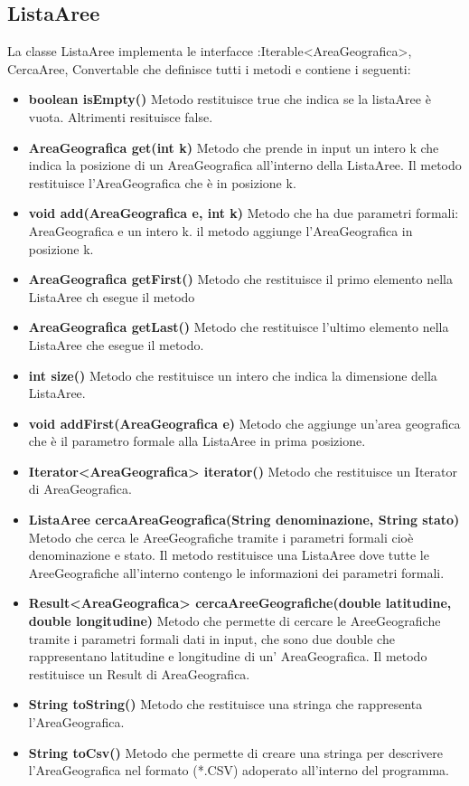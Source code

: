 \documentclass[a4paper, 12pt]{report}
\begin{document}
			\subsection{ListaAree}
			La classe ListaAree implementa le interfacce :Iterable<AreaGeografica>, CercaAree, Convertable che definisce tutti i metodi e contiene i seguenti:
			\begin{itemize}
			\item \textbf{boolean isEmpty()}
			Metodo restituisce true che indica se la listaAree è vuota. Altrimenti resituisce false.
			\item \textbf{AreaGeografica get(int k)}
			Metodo che prende in input un intero k che indica la posizione di un AreaGeografica all'interno della ListaAree. Il metodo restituisce l'AreaGeografica che è in posizione k.
			\item \textbf{void add(AreaGeografica e, int k)}
			Metodo che ha due parametri formali: AreaGeografica e un intero k.
			il metodo aggiunge l'AreaGeografica in posizione k.
			\item \textbf{AreaGeografica getFirst()}
			Metodo che restituisce il primo elemento nella ListaAree ch esegue il metodo
			\item \textbf{AreaGeografica getLast()}
			Metodo che restituisce l'ultimo elemento nella ListaAree che esegue il metodo.
			\item \textbf{int size()}
			Metodo che restituisce un intero che indica la dimensione della ListaAree.
			\item \textbf{void addFirst(AreaGeografica e)}
			Metodo che aggiunge un'area geografica che è il parametro formale alla ListaAree in prima posizione.
			\item \textbf{Iterator<AreaGeografica> iterator()}
			Metodo che restituisce un Iterator di AreaGeografica.
			\item \textbf{ListaAree cercaAreaGeografica(String denominazione, String stato)}
			Metodo che cerca le AreeGeografiche tramite i parametri formali cioè denominazione e stato. Il metodo restituisce una ListaAree dove tutte le AreeGeografiche all'interno contengo le informazioni dei parametri formali.
			\item \textbf{Result<AreaGeografica> cercaAreeGeografiche(double latitudine, double longitudine)}
			Metodo che permette di cercare le AreeGeografiche tramite i parametri formali dati in input, che sono due double che rappresentano latitudine e longitudine di un' AreaGeografica.
			Il metodo restituisce un Result di AreaGeografica.
			\item \textbf{String toString()}
			Metodo che restituisce una stringa che rappresenta l'AreaGeografica.
			\item \textbf{String toCsv()}
			Metodo che permette di creare una stringa per descrivere l'AreaGeografica nel formato (*.CSV) adoperato all'interno del programma.
			\end{itemize}
\end{document}
